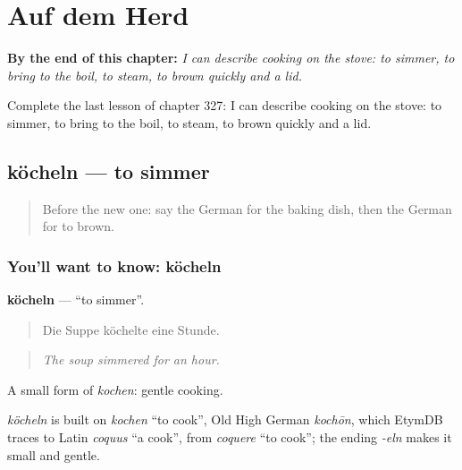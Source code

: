 
\chapter{Auf dem Herd}
\label{ch:ge-auf-dem-herd}

\begin{chapteropening}
\textbf{By the end of this chapter:} \emph{I can describe cooking on the stove: to simmer, to bring to the boil, to steam, to brown quickly and a lid.}

Complete the last lesson of chapter 327: I can describe cooking on the stove: to simmer, to bring to the boil, to steam, to brown quickly and a lid.
\end{chapteropening}

\section[köcheln]{köcheln — to simmer}

\label{lesson:GE-C327-koecheln}



\begin{quote}
Before the new one: say the German for the baking dish, then the German for to brown.
\end{quote}

\subsection*{You'll want to know: köcheln}
\textbf{köcheln} — \textquotedblleft{}to simmer\textquotedblright{}.

\begin{quote}
Die Suppe köchelte eine Stunde.
\end{quote}

\begin{quote}
\emph{The soup simmered for an hour.}
\end{quote}

A small form of \emph{kochen}: gentle cooking.

\begin{cousinweb}
\emph{köcheln} is built on \emph{kochen} \textquotedblleft{}to cook\textquotedblright{}, Old High German \emph{kochōn}, which EtymDB traces to Latin \emph{coquus} \textquotedblleft{}a cook\textquotedblright{}, from \emph{coquere} \textquotedblleft{}to cook\textquotedblright{}; the ending \emph{-eln} makes it small and gentle.
\end{cousinweb}


